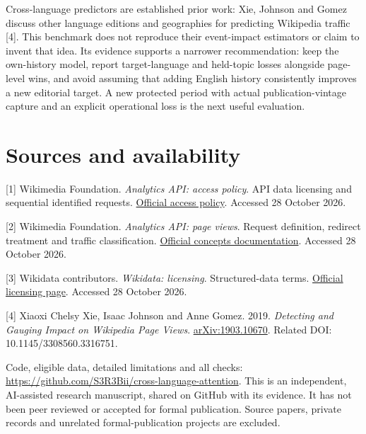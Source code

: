 \documentclass[11pt,letterpaper]{article}
\begin{document}
Cross-language predictors are established prior work: Xie, Johnson and Gomez discuss other language editions and geographies for predicting Wikipedia traffic [4]. This benchmark does not reproduce their event-impact estimators or claim to invent that idea. Its evidence supports a narrower recommendation: keep the own-history model, report target-language and held-topic losses alongside page-level wins, and avoid assuming that adding English history consistently improves a new editorial target. A new protected period with actual publication-vintage capture and an explicit operational loss is the next useful evaluation.

\section*{Sources and availability}
\small
[1] Wikimedia Foundation. \emph{Analytics API: access policy}. API data licensing and sequential identified requests. \href{https://doc.wikimedia.org/generated-data-platform/aqs/analytics-api/documentation/access-policy.html}{Official access policy}. Accessed 28 October 2026.

[2] Wikimedia Foundation. \emph{Analytics API: page views}. Request definition, redirect treatment and traffic classification. \href{https://doc.wikimedia.org/generated-data-platform/aqs/analytics-api/concepts/page-views.html}{Official concepts documentation}. Accessed 28 October 2026.

[3] Wikidata contributors. \emph{Wikidata: licensing}. Structured-data terms. \href{https://www.wikidata.org/wiki/Wikidata:Licensing}{Official licensing page}. Accessed 28 October 2026.

[4] Xiaoxi Chelsy Xie, Isaac Johnson and Anne Gomez. 2019. \emph{Detecting and Gauging Impact on Wikipedia Page Views}. \href{https://doi.org/10.48550/arXiv.1903.10670}{arXiv:1903.10670}. Related DOI: 10.1145/3308560.3316751.

Code, eligible data, detailed limitations and all checks: \url{https://github.com/S3R3Bii/cross-language-attention}. This is an independent, AI-assisted research manuscript, shared on GitHub with its evidence. It has not been peer reviewed or accepted for formal publication. Source papers, private records and unrelated formal-publication projects are excluded.
\end{document}
